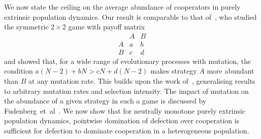 \documentclass{article}
\begin{document}
We now state the ceiling on the average abundance of cooperators in purely
extrinsic population dynamics. Our result is comparable to that
of~\cite{ANTAL2009340}, who studied the symmetric \(2\times2\) game with payoff
matrix
\begin{equation}
\begin{array}{c|cc}
    & A & B \\ \hline
A & a & b \\
B & c & d
\end{array}
\label{eq:abcd}
\end{equation}
and showed that, for a wide range of evolutionary processes with mutation, the
condition \(a(N-2) + bN > cN + d(N-2)\) makes strategy \(A\) more abundant than
\(B\) at any mutation rate. This builds upon the work of~\cite{Kandori,
Nowak2004Emergence}, generalising results to arbitrary mutation rates and
selection intensity. The impact of mutation on the abundance of a given strategy
in such a game is discussed by Fudenberg~et~al~\cite{FUDENBERG2006352}. We now
show that for neutrally monotone purely extrinsic population dynamics, pointwise
domination of defection over cooperation is sufficient for defection to dominate
cooperation in a heterogeneous population.
\end{document}
